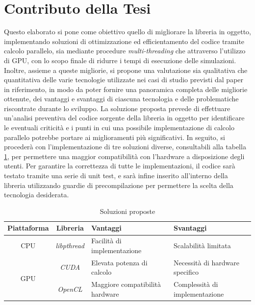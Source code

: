 \section{Contributo della Tesi}
\label{sec:contributo}

Questo elaborato si pone come obiettivo quello di migliorare la libreria in
oggetto, implementando soluzioni di ottimizzazione ed efficientamento del codice
tramite calcolo parallelo, sia mediante procedure \textit{multi-threading} che attraverso
l'utilizzo di GPU, con lo scopo finale di ridurre i tempi di esecuzione delle
simulazioni. Inoltre, assieme a queste migliorie, si propone una valutazione sia
qualitativa che quantitativa delle varie tecnologie utilizzate nei casi di studio
previsti dal paper in riferimento\cite{cooperis}, in modo da poter fornire una panoramica
completa delle migliorie ottenute, dei vantaggi e svantaggi di ciascuna
tecnologia e delle problematiche riscontrate durante lo sviluppo. La soluzione proposta
prevede di effettuare un'analisi preventiva del codice sorgente della libreria in
oggetto per identificare le eventuali criticità e i punti in cui una possibile implementazione
di calcolo parallelo potrebbe portare ai miglioramenti più significativi. In
seguito, si procederà con l'implementazione di tre soluzioni diverse,
consultabili alla tabella \ref{tab:soluzioni}, per permettere una maggior compatibilità
con l'hardware a disposizione degli utenti. Per garantire la correttezza di
tutte le implementazioni, il codice sarà testato tramite una serie di unit test,
e sarà infine inserito all'interno della libreria utilizzando guardie di
precompilazione per permettere la scelta della tecnologia desiderata.

\vspace{1em}

\begin{table}[ht]
  \begin{center}
    \begin{tabular}{ |c|c|l|l| }
      \hline
      \textbf{Piattaforma} & \textbf{Libreria}            & \textbf{Vantaggi}               & \textbf{Svantaggi}              \\
      \hline
      CPU                  & \textit{libpthread}          & Facilità di implementazione     & Scalabilità limitata            \\
      \hline
      \multirow{2}{*}{GPU} & \textit{CUDA}\cite{cuda}     & Elevata potenza di calcolo      & Necessità di hardware specifico \\
      \cline{2-4}          & \textit{OpenCL}\cite{opencl} & Maggiore compatibilità hardware & Complessità di implementazione  \\
      \hline
    \end{tabular}
    \caption{Soluzioni proposte}
    \label{tab:soluzioni}
  \end{center}
\end{table}